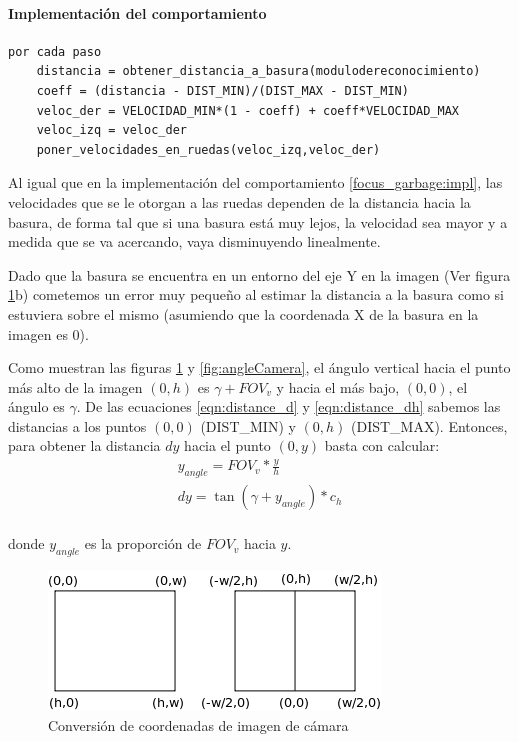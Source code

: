 \paragraph{Implementaci\'on del comportamiento}
\label{go_to_garbage:impl}
\begin{verbatim}
por cada paso
    distancia = obtener_distancia_a_basura(modulodereconocimiento)
    coeff = (distancia - DIST_MIN)/(DIST_MAX - DIST_MIN)
    veloc_der = VELOCIDAD_MIN*(1 - coeff) + coeff*VELOCIDAD_MAX
    veloc_izq = veloc_der
    poner_velocidades_en_ruedas(veloc_izq,veloc_der)
\end{verbatim}

Al igual que en la implementaci\'on del comportamiento \ref{focus_garbage:impl},
las velocidades que se le otorgan a las ruedas dependen de la distancia
hacia la basura, de forma tal que si una basura est\'a muy lejos, la velocidad
sea mayor y a medida que se va acercando, vaya disminuyendo linealmente.

Dado que la basura se encuentra en un entorno del eje Y en la imagen (Ver figura
\ref{fig:image_coord_conv}b) cometemos un error muy peque\~no al estimar la distancia
a la basura como si estuviera sobre el mismo (asumiendo que la coordenada X de la
basura en la imagen es 0).

Como muestran las figuras \ref{fig:image_coord_conv} y \ref{fig:angleCamera},
el \'angulo vertical hacia el punto m\'as alto de la imagen $(0,h)$ es 
$\gamma+FOV_v$ y hacia el m\'as bajo, $(0,0)$, el \'angulo es $\gamma$.
De las ecuaciones \eqref{eqn:distance_d} y \eqref{eqn:distance_dh} sabemos
las distancias a los puntos $(0,0)$ (DIST\_MIN) y $(0,h)$ (DIST\_MAX). 
Entonces, para obtener la distancia $dy$ hacia el punto $(0,y)$ basta con
calcular:
\begin{eqnarray}
y_{angle} = FOV_v * \frac{y}{h} \\
dy = \tan(\gamma + y_{angle}) * c_h \\
\end{eqnarray}

donde $y_{angle}$ es la proporci\'on de $FOV_v$ hacia $y$.
\begin{figure}[htp]
\begin{center}
\includegraphics[scale=0.5]{comportamientos/imageCoordsConvertion.png}
\caption{Conversi\'on de coordenadas de imagen de c\'amara}
\label{fig:image_coord_conv}
\end{center}
\end{figure}

